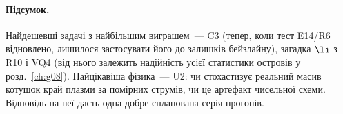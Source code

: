 \paragraph{Підсумок.} Найдешевші задачі з найбільшим виграшем~--- C3 (тепер, коли тест E14/R6
відновлено, лишилося застосувати його до залишків бейзлайну), загадка $\li$ з R10 і VQ4 (від нього залежить
надійність усієї статистики островів у розд.~\ref{ch:g08}). Найцікавіша фізика~--- U2: чи
стохастизує реальний масив котушок край плазми за помірних струмів, чи це артефакт чисельної
схеми. Відповідь на неї дасть одна добре спланована серія прогонів.
